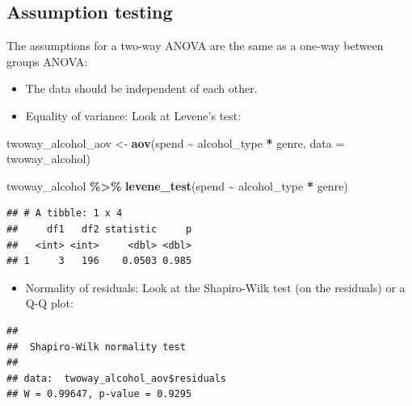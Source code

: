 \documentclass[
]{book}
\newenvironment{Shaded}{\begin{snugshade}}{\end{snugshade}}
\newcommand{\AttributeTok}[1]{\textcolor[rgb]{0.13,0.29,0.53}{#1}}
\newcommand{\FunctionTok}[1]{\textcolor[rgb]{0.13,0.29,0.53}{\textbf{#1}}}
\newcommand{\NormalTok}[1]{#1}
\newcommand{\OtherTok}[1]{\textcolor[rgb]{0.56,0.35,0.01}{#1}}
\newcommand{\SpecialCharTok}[1]{\textcolor[rgb]{0.81,0.36,0.00}{\textbf{#1}}}
\providecommand{\tightlist}{%
  \setlength{\itemsep}{0pt}\setlength{\parskip}{0pt}}
\begin{document}
\subsection{Assumption testing}\label{assumption-testing}

The assumptions for a two-way ANOVA are the same as a one-way between groups ANOVA:

\begin{itemize}
\tightlist
\item
  The data should be independent of each other.
\item
  Equality of variance: Look at Levene's test:
\end{itemize}

\begin{Shaded}
\begin{Highlighting}[]
\NormalTok{twoway\_alcohol\_aov }\OtherTok{\textless{}{-}} \FunctionTok{aov}\NormalTok{(spend }\SpecialCharTok{\textasciitilde{}}\NormalTok{ alcohol\_type }\SpecialCharTok{*}\NormalTok{ genre, }\AttributeTok{data =}\NormalTok{ twoway\_alcohol)}

\NormalTok{twoway\_alcohol }\SpecialCharTok{\%\textgreater{}\%}
  \FunctionTok{levene\_test}\NormalTok{(spend }\SpecialCharTok{\textasciitilde{}}\NormalTok{ alcohol\_type }\SpecialCharTok{*}\NormalTok{ genre)}
\end{Highlighting}
\end{Shaded}

\begin{verbatim}
## # A tibble: 1 x 4
##     df1   df2 statistic     p
##   <int> <int>     <dbl> <dbl>
## 1     3   196    0.0503 0.985
\end{verbatim}

\begin{itemize}
\tightlist
\item
  Normality of residuals: Look at the Shapiro-Wilk test (on the residuals) or a Q-Q plot:
\end{itemize}

\begin{Shaded}
\end{Shaded}

\begin{verbatim}
## 
##  Shapiro-Wilk normality test
## 
## data:  twoway_alcohol_aov$residuals
## W = 0.99647, p-value = 0.9295
\end{verbatim}
\end{document}
